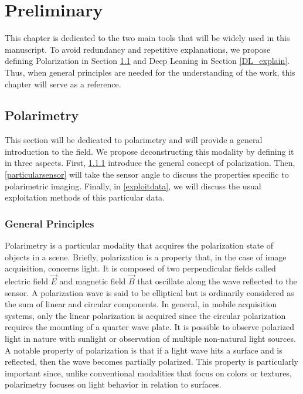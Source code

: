 
\chapter{Preliminary} %

\label{Chapter3} %


This chapter is dedicated to the two main tools that will be widely used in this manuscript. To avoid redundancy and repetitive explanations, we propose defining Polarization in Section \ref{Polar_explain} and Deep Leaning in Section \ref{DL_explain}. Thus, when general principles are needed for the understanding of the work, this chapter will serve as a reference.




\section{Polarimetry}\label{Polar_explain}

This section will be dedicated to polarimetry and will provide a general introduction to the field. We propose deconstructing this modality by defining it in three aspects. First, \ref{gdpola} introduce the general concept of polarization. Then, \ref{particularsensor} will take the sensor angle to discuss the properties specific to polarimetric imaging. Finally, in \ref{exploitdata}, we will discuss the usual exploitation methods of this particular data.


\subsection{General Principles}\label{gdpola}

Polarimetry \cite{collett2005field} is a particular modality that acquires the polarization state of objects in a scene. Briefly, polarization is a property that, in the case of image acquisition, concerns light. It is composed of two perpendicular fields called electric field $\vec{E}$ and magnetic field $\vec{B}$ that oscillate along the wave reflected to the sensor. A polarization wave is said to be elliptical but is ordinarily considered as the sum of linear and circular components.
In general, in mobile acquisition systems, only the linear polarization is acquired since the circular polarization requires the mounting of a quarter wave plate.
It is possible to observe polarized light in nature with sunlight or observation of multiple non-natural light sources. A notable property of polarization is that if a light wave hits a surface and is reflected, then the wave becomes partially polarized. This property is particularly important since, unlike conventional modalities that focus on colors or textures, polarimetry focuses on light behavior in relation to surfaces.

